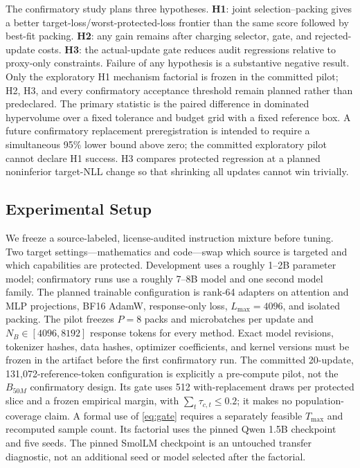 \documentclass{article}
\begin{document}
The confirmatory study plans three hypotheses. \textbf{H1}: joint
selection--packing gives a better target-loss/worst-protected-loss frontier than
the same score followed by best-fit packing. \textbf{H2}: any gain remains after
charging selector, gate, and rejected-update costs. \textbf{H3}: the
actual-update gate reduces audit regressions relative to proxy-only
constraints. Failure of any hypothesis is a substantive negative result.
Only the exploratory H1 mechanism factorial is frozen in the committed pilot;
H2, H3, and every confirmatory acceptance threshold remain planned rather than
predeclared.
The primary statistic is the paired difference in dominated hypervolume over a
fixed tolerance and budget grid with a fixed reference box. A future
confirmatory replacement preregistration is intended to require a simultaneous
95\% lower bound above zero; the committed exploratory pilot cannot declare
H1 success. H3 compares protected
regression at a planned noninferior target-NLL change so that shrinking all
updates cannot win trivially.

\subsection{Experimental Setup}

We freeze a source-labeled, license-audited instruction mixture before tuning.
Two target settings---mathematics and code---swap which source is targeted and
which capabilities are protected. Development uses a roughly 1--2B parameter
model; confirmatory runs use a roughly 7--8B model and one second model family.
The planned trainable configuration is rank-64 adapters on attention and MLP
projections, BF16 AdamW, response-only loss, $L_{\max}=4096$, and isolated
packing. The pilot freezes $P=8$ packs and microbatches per update and
$N_B\in[4096,8192]$ response tokens for every method. Exact model revisions,
tokenizer hashes, data hashes, optimizer
coefficients, and kernel versions must be frozen in the artifact before the
first confirmatory run.
The committed 20-update, 131,072-reference-token configuration is explicitly a
pre-compute pilot, not the $B_{50M}$ confirmatory design. Its gate uses 512
with-replacement draws per protected slice and a frozen empirical margin, with
$\sum_t\tau_{c,t}\le0.2$; it makes no population-coverage claim. A formal use
of \cref{eq:gate} requires a separately feasible $T_{\max}$ and recomputed
sample count. Its factorial uses the pinned Qwen 1.5B checkpoint and five
seeds. The pinned SmolLM checkpoint is an untouched transfer diagnostic, not
an additional seed or model selected after the factorial.
\end{document}
